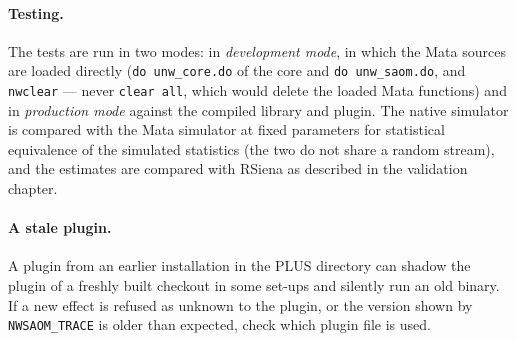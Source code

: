 \paragraph{Testing.} The tests are run in two modes: in \emph{development mode}, in which the Mata sources are loaded directly (\texttt{do unw\_core.do} of the core and \texttt{do unw\_saom.do}, and \texttt{nwclear} --- never \texttt{clear all}, which would delete the loaded Mata functions) and in \emph{production mode} against the compiled library and plugin. The native simulator is compared with the Mata simulator at fixed parameters for statistical equivalence of the simulated statistics (the two do not share a random stream), and the estimates are compared with RSiena as described in the validation chapter.

\paragraph{A stale plugin.} A plugin from an earlier installation in the PLUS directory can shadow the plugin of a freshly built checkout in some set-ups and silently run an old binary. If a new effect is refused as unknown to the plugin, or the version shown by \texttt{NWSAOM\_TRACE} is older than expected, check which plugin file is used.
